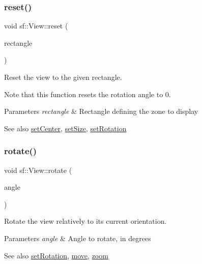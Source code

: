 \subsubsection{\texorpdfstring{reset()}{reset()}}
{\footnotesize\ttfamily void sf\+::\+View\+::reset (\begin{DoxyParamCaption}\item[{const \mbox{\hyperlink{classsf_1_1_rect}{Float\+Rect}} \&}]{rectangle }\end{DoxyParamCaption})}



Reset the view to the given rectangle. 

Note that this function resets the rotation angle to 0.


\begin{DoxyParams}{Parameters}
{\em rectangle} & Rectangle defining the zone to display\\
\hline
\end{DoxyParams}
\begin{DoxySeeAlso}{See also}
\mbox{\hyperlink{classsf_1_1_view_aa8e3fedb008306ff9811163545fb75f2}{set\+Center}}, \mbox{\hyperlink{classsf_1_1_view_a9525b73fe9fbaceb9568faf56b399dab}{set\+Size}}, \mbox{\hyperlink{classsf_1_1_view_a24d0503c9c51f5ef5918612786d325c1}{set\+Rotation}} \begin{DoxyVerb}\end{DoxyVerb}
 
\end{DoxySeeAlso}
\mbox{\label{classsf_1_1_view_a5fd3901aae1845586ca40add94faa378}} 
\subsubsection{\texorpdfstring{rotate()}{rotate()}}
{\footnotesize\ttfamily void sf\+::\+View\+::rotate (\begin{DoxyParamCaption}\item[{float}]{angle }\end{DoxyParamCaption})}



Rotate the view relatively to its current orientation. 


\begin{DoxyParams}{Parameters}
{\em angle} & Angle to rotate, in degrees\\
\hline
\end{DoxyParams}
\begin{DoxySeeAlso}{See also}
\mbox{\hyperlink{classsf_1_1_view_a24d0503c9c51f5ef5918612786d325c1}{set\+Rotation}}, \mbox{\hyperlink{classsf_1_1_view_a0c82144b837caf812f7cb25a43d80c41}{move}}, \mbox{\hyperlink{classsf_1_1_view_a4a72a360a5792fbe4e99cd6feaf7726e}{zoom}} \begin{DoxyVerb}\end{DoxyVerb}
 
\end{DoxySeeAlso}
\mbox{\label{classsf_1_1_view_aa8e3fedb008306ff9811163545fb75f2}} 

